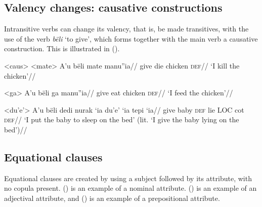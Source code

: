 \documentclass[12pt]{article}
\begin{document}
\subsection{Valency changes: causative constructions}

Intransitive verbs can change its valency, that is, be made transitives, with the use of the verb \textit{bëli} `to give', which forms together with the main verb a causative construction. This is illustrated in ().

\pex<caus> %
\a<mate> %
\begingl %
\gla A'u bëli mate manu''ia//
\glb \First{}\Sg{} give die chicken \textsc{def}//
\glft `I kill the chicken'//
\endgl

\a<ga> %
\begingl %
\gla A'u bëli ga manu''ia//
\glb  \First{}\Sg{} give eat chicken \textsc{def}//
\glft `I feed the chicken'// 
\endgl

\a<du'e'> %
\begingl %
\gla A’u bëli {dedi nurak} ‘ia du’e’ ‘ia tepi ‘ia//
\glb \First{}\Sg{} give baby \textsc{def} lie \textsc{LOC} cot \textsc{def}//
\glft `I put the baby to sleep on the bed' (lit. `I give the baby lying on the bed')// 
\endgl
\xe

\subsection{Equational clauses}

Equational clauses are created by using a subject followed by its attribute, with no copula present. () is an example of a nominal attribute. () is an example of an adjectival attribute, and () is an example of a prepositional attribute. 


\end{document}
